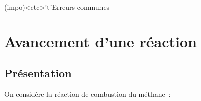 \documentclass[../../main/main.tex]{subfiles}
\begin{document}
\begin{tcn}[%
		sidebyside, fontupper=\small, fontlower=\small
	]
	\begin{tcn}[nsp](impo)<ctc>'t'{Erreurs communes}
		\vspace{-25pt}
	\end{tcn}
\end{tcn}

\vspace*{\fill}

\newpage

\section{Avancement d'une réaction}
\subsection{Présentation}
On considère la réaction de combustion du méthane~:
\psw{%
	\[
		\ce{CH4_{\gaz} + 2 O2_{\gaz} = CO2_{\gaz} + 2H2O_{\gaz}}
	\]
}\vspace{-15pt}
\end{document}
